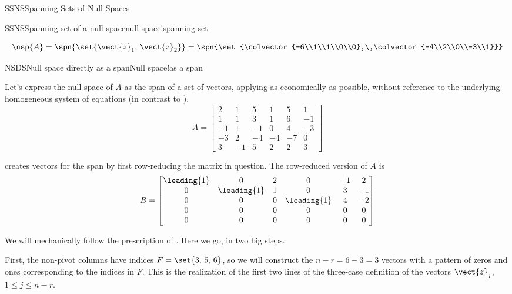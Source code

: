 \begin{subsect}{SSNS}{Spanning Sets of Null Spaces}
\begin{example}{SSNS}{Spanning set of a null space}{null space!spanning set}
\begin{para}
\begin{equation*}
\nsp{A}
=\spn{\set{\vect{z}_1,\,\vect{z}_2}}
=\spn{\set{\colvector{-6\\1\\1\\0\\0},\,\colvector{-4\\2\\0\\-3\\1}}}
\end{equation*}
\end{para}
%
\end{example}
%
%
\begin{example}{NSDS}{Null space directly as a span}{Null space!as a span}
\begin{para}Let's express the null space of $A$ as the span of a set of vectors, applying  as economically as possible, without reference to the underlying homogeneous system of equations (in contrast to ).
%
\begin{equation*}
A=
\begin{bmatrix}
 2 & 1 & 5 & 1 & 5 & 1 \\
 1 & 1 & 3 & 1 & 6 & -1 \\
 -1 & 1 & -1 & 0 & 4 & -3 \\
 -3 & 2 & -4 & -4 & -7 & 0 \\
 3 & -1 & 5 & 2 & 2 & 3
\end{bmatrix}
\end{equation*}
\end{para}
%
\begin{para} creates vectors for the span by first row-reducing the matrix in question.  The row-reduced version of $A$ is
%
\begin{equation*}
B=
\begin{bmatrix}
 \leading{1} & 0 & 2 & 0 & -1 & 2 \\
 0 & \leading{1} & 1 & 0 & 3 & -1 \\
 0 & 0 & 0 & \leading{1} & 4 & -2 \\
 0 & 0 & 0 & 0 & 0 & 0 \\
 0 & 0 & 0 & 0 & 0 & 0
\end{bmatrix}
\end{equation*}
\end{para}
%
\begin{para}We will mechanically follow the prescription of .  Here we go, in two big steps.\end{para}
%
\begin{para}First, the non-pivot columns have indices $F=\set{3,\,5,\,6}$, so we will construct the $n-r=6-3=3$ vectors with a pattern of zeros and ones corresponding to the indices in $F$.  This is the realization of the first two lines of the three-case definition of the vectors $\vect{z}_j$, $1\leq j\leq n-r$.

\end{para}
\end{example}
\end{subsect}
